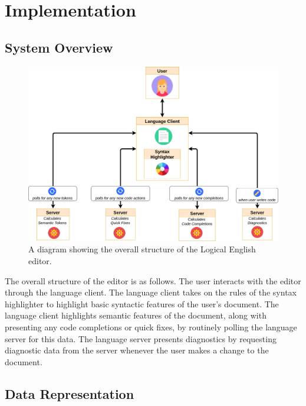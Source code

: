\documentclass[../main.tex]{subfiles}
\begin{document}
\chapter{Implementation}
\section{System Overview}
\begin{figure}[h!]
\centering
\includegraphics[width = \linewidth]{./figures/le-editor.png}
\caption{A diagram showing the overall structure of the Logical English editor.}
\label{fig:logo}
\end{figure}
The overall structure of the editor is as follows. The user interacts with the editor through the language client. The language client takes on the rules of the syntax highlighter to highlight basic syntactic features of the user's document. The language client highlights semantic features of the document, along with presenting any code completions or quick fixes, by routinely polling the language server for this data. The language server presents diagnostics by requesting diagnostic data from the server whenever the user makes a change to the document.

\section{Data Representation}
\end{document}

